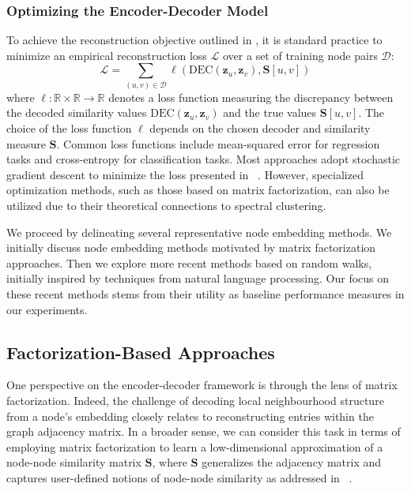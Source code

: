 \subsubsection{Optimizing the Encoder-Decoder Model}
To achieve the reconstruction objective outlined in , it is standard practice to minimize an empirical reconstruction loss $ \mathcal{L} $ over a set of training node pairs $ \mathcal{D} $:
\begin{equation}\label{eq:loss}
    \mathcal{L} = \sum_{(u,v)\in\mathcal{D}} \ell(\text{DEC}(\mathbf{z}_u, \mathbf{z}_v), \textbf{S}[u,v])
\end{equation}
where $ \ell: \mathbb{R}\times\mathbb{R}\to\mathbb{R} $ denotes a loss function measuring the discrepancy between the decoded similarity values $ \text{DEC}(\mathbf{z}_u, \mathbf{z}_v) $ and the true values $ \textbf{S}[u,v] $. The choice of the loss function $ \ell $ depends on the chosen decoder and similarity measure $ \textbf{S} $. Common loss functions include mean-squared error for regression tasks and cross-entropy for classification tasks. Most approaches adopt stochastic gradient descent to minimize the loss presented in ~\cite{Robbins1951stochasticApproximation}. However, specialized optimization methods, such as those based on matrix factorization, can also be utilized due to their theoretical connections to spectral clustering.

We proceed by delineating several representative node embedding methods. We initially discuss node embedding methods motivated by matrix factorization approaches. Then we explore more recent methods based on random walks, initially inspired by techniques from natural language processing. Our focus on these recent methods stems from their utility as baseline performance measures in our experiments.

\subsection{Factorization-Based Approaches}\label{sec:factorization}
One perspective on the encoder-decoder framework is through the lens of matrix factorization. Indeed, the challenge of decoding local neighbourhood structure from a node's embedding closely relates to reconstructing entries within the graph adjacency matrix. In a broader sense, we can consider this task in terms of employing matrix factorization to learn a low-dimensional approximation of a node-node similarity matrix $ \mathbf{S} $, where $ \mathbf{S} $ generalizes the adjacency matrix and captures user-defined notions of node-node similarity as addressed in ~\cite{Belkin2001laplacianEigenmapsSpectralClusteringTechniquesEmbeddingClustering}\cite{Kruskal1964MultidimensionalScalingOptimizingGoodnessFitNonmetricHypothesis}.

